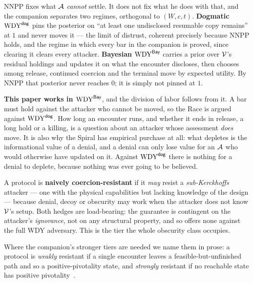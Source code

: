 \begin{definition}\label{def:belief}
NNPP fixes what $\mathcal{A}$ \emph{cannot} settle. It does not fix what he does
with that, and the companion separates two regimes, orthogonal to $(W,c,t)$.
\textbf{Dogmatic} $\mathrm{WDY}^{\mathsf{dog}}$ pins the posterior on ``at least one undisclosed
resumable copy remains'' at $1$ and never moves it --- the limit of distrust,
coherent precisely because NNPP holds, and the regime in which every bar in the
companion is proved, since clearing it clears every attacker.
\textbf{Bayesian} $\mathrm{WDY}^{\mathsf{Bay}}$ carries a prior over $\mathcal{V}$'s residual holdings
and updates it on what the encounter discloses, then chooses among release,
continued coercion and the terminal move by expected utility. By NNPP that
posterior never reaches $0$; it is simply not pinned at $1$.
\end{definition}

\noindent \textbf{This paper works in $\mathrm{WDY}^{\mathsf{Bay}}$}, and the division of labor
follows from it. A bar must hold against the attacker who cannot be moved, so
the Race is argued against $\mathrm{WDY}^{\mathsf{dog}}$. How long an encounter runs, and whether it
ends in release, a long hold or a killing, is a question about an attacker whose
assessment \emph{does} move. It is also why the Spiral has empirical
purchase at all: what depletes is the informational value of a denial, and a
denial can only lose value for an $\mathcal{A}$ who would otherwise have updated
on it. Against $\mathrm{WDY}^{\mathsf{dog}}$ there is nothing for a denial to deplete, because
nothing was ever going to be believed.

\begin{definition}\label{def:naive-cr}
A protocol is \textbf{naively coercion-resistant} if it \emph{may} resist a
\emph{sub-Kerckhoffs} attacker --- one with the physical capabilities but lacking
knowledge of the design --- because denial, decoy or obscurity may work when the
attacker does not know $\mathcal{V}$'s setup. Both hedges are load-bearing: the
guarantee is contingent on the attacker's \emph{ignorance}, not on any structural
property, and so offers none against the full WDY adversary. This is the tier the
whole obscurity class occupies.
\end{definition}

\noindent Where the companion's stronger tiers are needed we name them in prose:
a protocol is \emph{weakly} resistant if a single encounter leaves a
feasible-but-unfinished path and so a positive-pivotality state, and
\emph{strongly} resistant if no reachable state has positive
pivotality~\cite[\S3]{deadly-race}.

